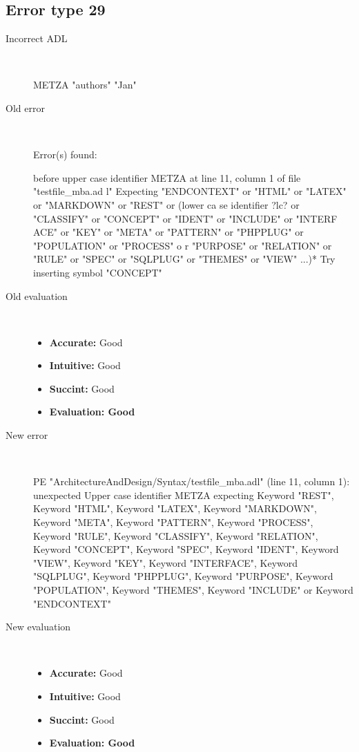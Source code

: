 \subsection{Error type 29}
  \begin{description}
  \item[Incorrect ADL]~\\
\begin{adl}
METZA "authors"  "Jan"\end{adl}
  \item[Old error]~\\
\begin{haskell}
Error(s) found:

before upper case identifier METZA at line 11, column 1 of file "testfile_mba.ad
l"
Expecting "ENDCONTEXT" or "HTML" or "LATEX" or "MARKDOWN" or "REST" or (lower ca
se identifier ?lc? or "CLASSIFY" or "CONCEPT" or "IDENT" or "INCLUDE" or "INTERF
ACE" or "KEY" or "META" or "PATTERN" or "PHPPLUG" or "POPULATION" or "PROCESS" o
r "PURPOSE" or "RELATION" or "RULE" or "SPEC" or "SQLPLUG" or "THEMES" or "VIEW"
 ...)*
Try inserting symbol "CONCEPT"\end{haskell}
  \item[Old evaluation]~\\
    \begin{itemize}
    \item \textbf{Accurate:} Good
    \item \textbf{Intuitive:} Good
    \item \textbf{Succint:} Good
    \item \textbf{Evaluation: Good}
    \end{itemize}
  \item[New error]~\\
\begin{haskell}
PE "ArchitectureAndDesign/Syntax/testfile_mba.adl" (line 11, column 1):
unexpected Upper case identifier METZA
expecting Keyword "REST", Keyword "HTML", Keyword "LATEX", Keyword "MARKDOWN", Keyword "META", Keyword "PATTERN", Keyword "PROCESS", Keyword "RULE", Keyword "CLASSIFY", Keyword "RELATION", Keyword "CONCEPT", Keyword "SPEC", Keyword "IDENT", Keyword "VIEW", Keyword "KEY", Keyword "INTERFACE", Keyword "SQLPLUG", Keyword "PHPPLUG", Keyword "PURPOSE", Keyword "POPULATION", Keyword "THEMES", Keyword "INCLUDE" or Keyword "ENDCONTEXT"
\end{haskell}
  \item[New evaluation]~\\
    \begin{itemize}
    \item \textbf{Accurate:} Good
    \item \textbf{Intuitive:} Good
    \item \textbf{Succint:} Good
    \item \textbf{Evaluation: Good
}
    \end{itemize}
  \end{description}

